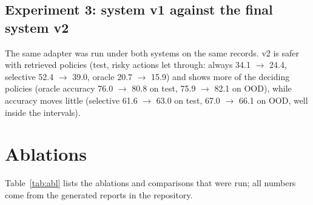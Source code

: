 \documentclass[10pt]{article}
\begin{document}
\subsection{Experiment 3: system v1 against the final system v2}
The same adapter was run under both systems on the same records. v2 is safer with retrieved policies (test,
risky actions let through: always 34.1 $\rightarrow$ 24.4, selective 52.4 $\rightarrow$ 39.0, oracle 20.7
$\rightarrow$ 15.9) and shows more of the deciding policies (oracle accuracy 76.0 $\rightarrow$ 80.8 on test,
75.9 $\rightarrow$ 82.1 on OOD), while accuracy moves little (selective 61.6 $\rightarrow$ 63.0 on test,
67.0 $\rightarrow$ 66.1 on OOD, well inside the intervals).


\section{Ablations}\label{sec:abl}
Table~\ref{tab:abl} lists the ablations and comparisons that were run; all numbers come from the generated
reports in the repository.
\end{document}
